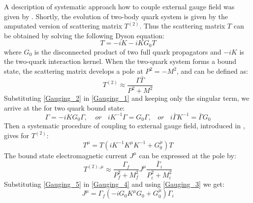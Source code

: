 A description of systematic approach how to couple external gauge field was given by \cite{Sanchis-Alepuz:2013iia}. Shortly, the evolution of two-body quark system is given by the amputated version of scattering matrix $T^{(2)}$. Thus the scattering matrix $T$ can be obtained by solving the following Dyson equation:
\begin{equation}
\displaystyle T=-iK-iKG_0T
\label{Gauging_1}
\end{equation}
where $G_0$ is the disconnected product of two full quark propagators and $-iK$ is the two-quark interaction kernel. When the two-quark system forms a bound state, the scattering matrix develops a pole at $P^2=-M^2$, and can be defined as:
\begin{equation}
\displaystyle T^{(2)}\approx \frac{\Gamma \bar \Gamma}{P^2+M^2}
\label{Gauging_2}
\end{equation}
Substituting \ref{Gauging_2} in \ref{Gauging_1} and keeping only the singular term, we arrive at the \BSE for two quark bound state:
\begin{equation}
\displaystyle \Gamma = -iKG_0\Gamma,\:\:\:\:\ or \:\:\:\: iK^{-1}\Gamma = G_0\Gamma, \:\:\:\: or \:\:\:\: i\bar{\Gamma}K^{-1}=\bar{\Gamma}G_0
\label{Gauging_3}
\end{equation}
Then a systematic procedure of coupling to external gauge field, introduced in \cite{Kvinikhidze:1998xn}, gives for $T^{(2)}$:
\begin{equation}
\displaystyle T^\mu = T(iK^{-1} K^\mu K^{-1} + G_0^\mu)T
\label{Gauging_4}
\end{equation}
The bound state electromagnetic current $J^\mu$ can be expressed at the pole by:
\begin{equation}
\displaystyle T^{(2), \mu} \approx \frac{\Gamma_f}{P^2_f+M^2_f}J^\mu\frac{\bar \Gamma_i}{P^2_i+M^2_i}
\label{Gauging_5}
\end{equation}
Substituting \ref{Gauging_5} in \ref{Gauging_4} and using \ref{Gauging_3} we get:
\begin{equation}
\displaystyle J^\mu= \Gamma_f (-iG_0 K^\mu G_0 + G_0^\mu) \Gamma_i
\label{pion:pion_EM_current}
\end{equation} 

